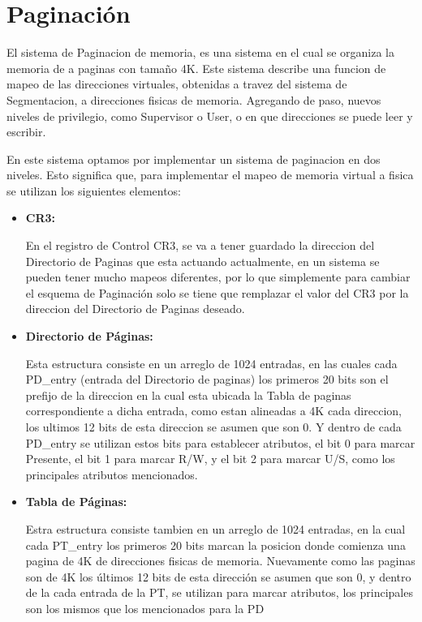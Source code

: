 \section{Paginación}
\par{El sistema de Paginacion de memoria, es una sistema en el cual se organiza la memoria de a paginas con tamaño 4K. Este sistema describe una funcion de mapeo de las direcciones virtuales, obtenidas a travez del sistema de Segmentacion, a direcciones fisicas de memoria. Agregando de paso, nuevos niveles de privilegio, como Supervisor o User, o en que direcciones se puede leer y escribir.}
\par{En este sistema optamos por implementar un sistema de paginacion en dos niveles. Esto significa que, para implementar el mapeo de memoria virtual a fisica se utilizan los siguientes elementos: }
\begin{itemize}
	\item {\bfseries CR3: }
	\par{ En el registro de Control CR3, se va a tener guardado la direccion del Directorio de Paginas que esta actuando actualmente, en un sistema se pueden tener mucho mapeos diferentes, por lo que simplemente para cambiar el esquema de Paginación solo se tiene que remplazar el valor del CR3 por la direccion del Directorio de Paginas deseado.}
	\item {\bfseries Directorio de Páginas: }
	\par{Esta estructura consiste en un arreglo de 1024 entradas, en las cuales cada PD\_entry (entrada del Directorio de paginas) los primeros 20 bits son el prefijo de la direccion en la cual esta ubicada la Tabla de paginas correspondiente  a dicha entrada, como estan alineadas a 4K cada direccion, los ultimos 12 bits de esta direccion se asumen que son 0. Y dentro de cada PD\_entry se utilizan estos bits para establecer atributos, el bit 0 para marcar Presente, el bit 1 para marcar R/W, y el bit 2 para marcar U/S, como los principales atributos mencionados.}
	\item {\bfseries Tabla de Páginas: }
	\par{Estra estructura consiste tambien en un arreglo de 1024 entradas, en la cual cada PT\_entry los primeros 20 bits marcan la posicion donde comienza una pagina de 4K de direcciones fisicas de memoria. Nuevamente como las paginas son de 4K los últimos 12 bits de esta dirección se asumen que son 0, y dentro de la cada entrada de la PT, se utilizan para marcar atributos, los principales son los mismos que los mencionados para la PD}
\end{itemize}


